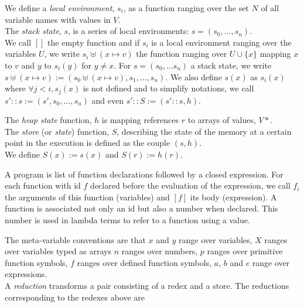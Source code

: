 \documentclass[12pt,a4paper]{article}
\begin{document}
We define a \emph{local environment}, $s_i$, as a function ranging over the set $N$ of all variable names with values in $V$.\\
The \emph{stack state}, $s$, is a series of local environments: $s = (s_0, ... , s_n)$.\\
We call $[]$ the empty function and if $s_i$ is a local environment ranging over the variables $U$, we write $s_i \uplus (x \mapsto v)$ the function ranging over $U \cup \{x\}$ mapping $x$ to $v$ and $y$ to $s_i(y)$ for $y \neq x$. For $s = (s_0, ... s_n)$ a stack state, we write $s \uplus (x \mapsto v) := \left( s_0 \uplus (x \mapsto v), s_1, ... , s_n \right)$. We also define $s(x)$ as $s_i(x)$ where $\forall j < i, s_j(x)$ is not defined and to simplify notations, we call $s' :: s := (s', s_0, ... , s_n)$ and even $s' :: S  := (s' :: s, h)$.

The \emph{heap state} function, $h$ is mapping references $r$ to arrays of values, $V*$.\\

The \emph{store} (or \emph{state}) function, $S$, describing the state of the memory at a certain point in the execution is defined as the couple $(s, h)$.\\
We define $S(x) := s(x)$ and $S(r) := h(r)$.

A program is list of function declarations followed by a closed expression. For each function with id $f$ declared before the evaluation of the expression, we call $f_i$ the arguments of this function (variables) and $[f]$ its body (expression). A function is associated not only an id but also a number when declared. This number is used in lambda terms to refer to a function using a value.

The meta-variable conventions are that $x$ and $y$ range over variables, $X$ ranges over variables typed as arrays $n$ ranges over numbers, $p$ ranges over primitive function symbols, $f$ ranges over defined function symbols, $a$, $b$ and $e$ range over expressions. \\

A \emph{reduction} transforms a pair consisting of a redex and a store. The reductions corresponding to the redexes above are
\end{document}
